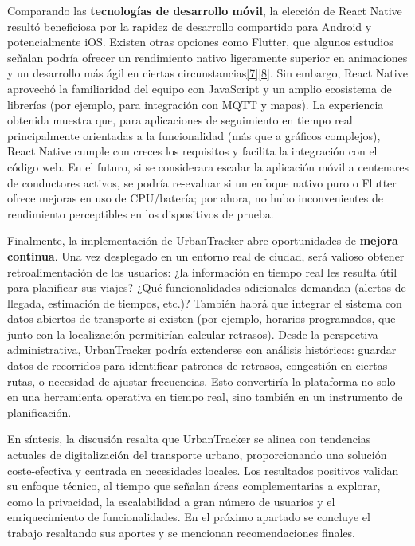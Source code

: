 \documentclass[
]{article}
\begin{document}
Comparando las \textbf{tecnologías de desarrollo móvil}, la elección de
React Native resultó beneficiosa por la rapidez de desarrollo compartido
para Android y potencialmente iOS. Existen otras opciones como Flutter,
que algunos estudios señalan podría ofrecer un rendimiento nativo
ligeramente superior en animaciones y un desarrollo más ágil en ciertas
circunstancias\href{https://fliphtml5.com/lqsof/cdpg/Art\%C3\%ADculos/\#:~:text=librer\%C3\%ADas\%20externas\%20para\%20muchos\%20componentes,tener\%20un\%20rendimiento\%20menor\%20en}{{[}7{]}}\href{https://fliphtml5.com/lqsof/cdpg/Art\%C3\%ADculos/\#:~:text=potentes\%20y\%20de\%20c\%C3\%B3digo\%20abierto\%2C,cuanto\%20al\%20tiempo\%20de\%20creaci\%C3\%B3n}{{[}8{]}}.
Sin embargo, React Native aprovechó la familiaridad del equipo con
JavaScript y un amplio ecosistema de librerías (por ejemplo, para
integración con MQTT y mapas). La experiencia obtenida muestra que, para
aplicaciones de seguimiento en tiempo real principalmente orientadas a
la funcionalidad (más que a gráficos complejos), React Native cumple con
creces los requisitos y facilita la integración con el código web. En el
futuro, si se considerara escalar la aplicación móvil a centenares de
conductores activos, se podría re-evaluar si un enfoque nativo puro o
Flutter ofrece mejoras en uso de CPU/batería; por ahora, no hubo
inconvenientes de rendimiento perceptibles en los dispositivos de
prueba.

Finalmente, la implementación de UrbanTracker abre oportunidades de
\textbf{mejora continua}. Una vez desplegado en un entorno real de
ciudad, será valioso obtener retroalimentación de los usuarios: ¿la
información en tiempo real les resulta útil para planificar sus viajes?
¿Qué funcionalidades adicionales demandan (alertas de llegada,
estimación de tiempos, etc.)? También habrá que integrar el sistema con
datos abiertos de transporte si existen (por ejemplo, horarios
programados, que junto con la localización permitirían calcular
retrasos). Desde la perspectiva administrativa, UrbanTracker podría
extenderse con análisis históricos: guardar datos de recorridos para
identificar patrones de retrasos, congestión en ciertas rutas, o
necesidad de ajustar frecuencias. Esto convertiría la plataforma no solo
en una herramienta operativa en tiempo real, sino también en un
instrumento de planificación.

En síntesis, la discusión resalta que UrbanTracker se alinea con
tendencias actuales de digitalización del transporte urbano,
proporcionando una solución coste-efectiva y centrada en necesidades
locales. Los resultados positivos validan su enfoque técnico, al tiempo
que señalan áreas complementarias a explorar, como la privacidad, la
escalabilidad a gran número de usuarios y el enriquecimiento de
funcionalidades. En el próximo apartado se concluye el trabajo
resaltando sus aportes y se mencionan recomendaciones finales.
\end{document}
